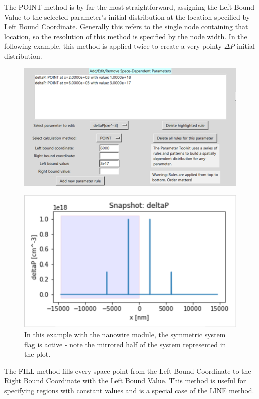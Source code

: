 \documentclass[11pt,letterpaper,titlepage]{article}
\begin{document}
		\par The POINT method is by far the most straightforward, assigning the Left Bound Value to the selected parameter’s initial distribution at the location specified by Left Bound Coordinate. Generally this refers to the single node containing that location, so the resolution of this method is specified by the node width. In the following example, this method is applied twice to create a very pointy $\Delta P$ initial distribution.
		
		\begin{figure}[H]
			\label{fig:ptoolkit_point}
			\centering
			\includegraphics[scale=1]{"ptoolkit_point"}
		\end{figure}
		\begin{figure}[H]
			\label{fig:ptoolkit_point_plot}
			\centering
			\includegraphics[scale=1]{"ptoolkit_point_plot"}
			\caption{In this example with the nanowire module, the symmetric system flag is active - note the mirrored half of the system represented in the plot.}
		\end{figure}
	
		\par The FILL method fills every space point from the Left Bound Coordinate to the Right Bound Coordinate with the Left Bound Value. This method is useful for specifying regions with constant values and is a special case of the LINE method.
		
\end{document}
